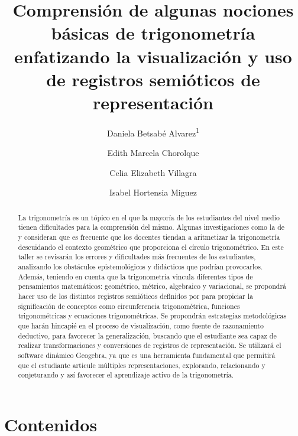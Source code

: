 \documentclass[oneside,spanish]{amsart}
\numberwithin{equation}{section}
\numberwithin{figure}{section}
\begin{document}
\title[Visualización y uso de registros semióticos en trigonometría]{Comprensión de algunas nociones básicas de  trigonometría enfatizando la  visualización y uso de registros semióticos de representación\vspace{-2ex}}
\author[1]{Daniela Betsabé Alvarez\textsuperscript{1}}
\address[1]{Universidad Nacional de Salta. Sede Regional Orán}
\author[2]{Edith Marcela Chorolque}
\author[3]{Celia Elizabeth Villagra}
\author[4]{Isabel Hortensia Miguez}

\begin{abstract}
	  La trigonometría es un tópico en el que la mayoría de los estudiantes del nivel medio tienen dificultades para la comprensión del mismo. Algunas investigaciones como la de \citet{torres-montiel-cuevas} y \citet{moore-k} consideran que es frecuente que los docentes tiendan a aritmetizar la trigonometría descuidando el contexto geométrico que proporciona el círculo trigonométrico. En este taller se revisarán los errores y dificultades más frecuentes de los estudiantes, analizando los obstáculos epistemológicos y didácticos que podrían provocarlos. Además, teniendo en cuenta que la trigonometría vincula diferentes tipos de pensamientos matemáticos: geométrico, métrico, algebraico y variacional, se propondrá hacer uso de los distintos registros semióticos definidos  por \citet{duval-r} para propiciar la significación de conceptos como circunferencia trigonométrica, funciones trigonométricas y ecuaciones trigonométricas. Se propondrán estrategias metodológicas que harán   hincapié en el proceso de visualización, como fuente de razonamiento deductivo, para favorecer la generalización, buscando que el estudiante sea capaz de realizar transformaciones y conversiones de registros de representación. Se utilizará el software dinámico Geogebra, ya que es  una herramienta fundamental que permitirá que el estudiante articule múltiples representaciones, explorando, relacionando y conjeturando y así favorecer el aprendizaje activo de la trigonometría.
\end{abstract}

\maketitle
\thispagestyle{empty}

\section{Contenidos}
\end{document}
